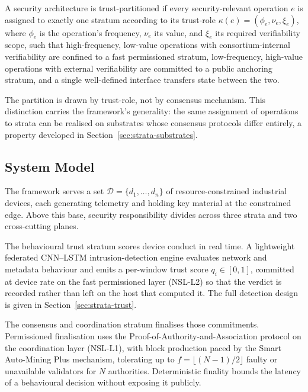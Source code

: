 \begin{definition}
\label{def:trust-partition}
A security architecture is trust-partitioned if every security-relevant operation $e$ is assigned to exactly one stratum according to its trust-role $\kappa(e)=(\phi_e,\nu_e,\xi_e)$, where $\phi_e$ is the operation's frequency, $\nu_e$ its value, and $\xi_e$ its required verifiability scope, such that high-frequency, low-value operations with consortium-internal verifiability are confined to a fast permissioned stratum, low-frequency, high-value operations with external verifiability are committed to a public anchoring stratum, and a single well-defined interface transfers state between the two.
\end{definition}

The partition is drawn by trust-role, not by consensus mechanism. This distinction carries the framework's generality: the same assignment of operations to strata can be realised on substrates whose consensus protocols differ entirely, a property developed in Section~\ref{sec:strata-substrates}.

\subsection{System Model}
\label{subsec:strata-sysmodel}

The framework serves a set $\mathcal{D}=\{d_1,\dots,d_n\}$ of resource-constrained industrial devices, each generating telemetry and holding key material at the constrained edge. Above this base, security responsibility divides across three strata and two cross-cutting planes.

The behavioural trust stratum scores device conduct in real time. A lightweight federated CNN--LSTM intrusion-detection engine evaluates network and metadata behaviour and emits a per-window trust score $q_i \in [0,1]$, committed at device rate on the fast permissioned layer (NSL-L2) so that the verdict is recorded rather than left on the host that computed it. The full detection design is given in Section~\ref{sec:strata-trust}.

The consensus and coordination stratum finalises those commitments. Permissioned finalisation uses the Proof-of-Authority-and-Association protocol on the coordination layer (NSL-L1), with block production paced by the Smart Auto-Mining Plus mechanism, tolerating up to $f=\lfloor (N-1)/2 \rfloor$ faulty or unavailable validators for $N$ authorities. Deterministic finality bounds the latency of a behavioural decision without exposing it publicly.

